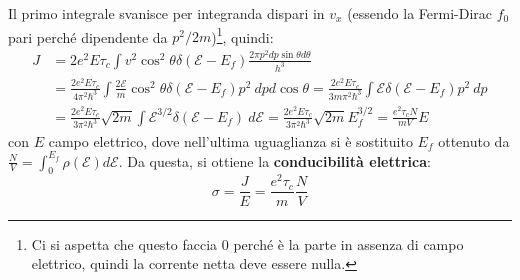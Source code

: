 \documentclass[10pt, a4paper]{scrartcl}
\numberwithin{equation}{subsection}
\theoremstyle{style1}
\theoremstyle{style2}
\begin{document}
Il primo integrale svanisce per integranda dispari in $v_x$ (essendo la Fermi-Dirac $f_0$ pari perch\'e dipendente da $p^2 / 2m$)\footnote{Ci si aspetta che questo faccia $0$ perch\'e \`e la parte in assenza di campo elettrico, quindi la corrente netta deve essere nulla.}, quindi:
\begin{equation}
	\begin{split}
		J &= 2e^2 E \tau _c \int v^2 \cos^2 \theta  \delta (\mathscr{E} -E_f) \frac{2\pi p ^2 dp \sin \theta  d\theta }{h^3}\\
		  & = \frac{2e^2 E \tau _c }{4\pi^2 \hbar ^3} \int \frac{2\mathscr{E}}{m} \cos^2 \theta \delta (\mathscr{E}-E_f) p^2 \ dp d\cos \theta = \frac{2e^2 E \tau _c}{3 m \pi^2 \hbar ^3} \int \mathscr{E} \delta (\mathscr{E} - E_f) p^2 \ dp\\
		  &= \frac{2 e^2 E \tau _c}{3 \pi ^2 \hbar ^3} \sqrt{ 2m}  \int \mathscr{E }^{3 / 2}  \delta (\mathscr{E}-E_f) \ d\mathscr{E} = \frac{2e^2 E \tau _c}{3 \pi^2 \hbar ^3} \sqrt{2m}  E_f ^{3 / 2} = \frac{e^2 \tau _c N}{mV } E
	\end{split}
\end{equation}
con $E $ campo elettrico, dove nell'ultima uguaglianza si \`e sostituito $E_f$ ottenuto da $\frac{N}{V}=\int_{0} ^{E_f} \rho (\mathscr{E}) d  \mathscr{E}$. Da questa, si ottiene la \textbf{conducibilit\`a elettrica}:
\begin{equation}
	\sigma  = \frac{J}{E} = \frac{e^2 \tau _c}{m} \frac{N}{V}
\end{equation}
\end{document}
